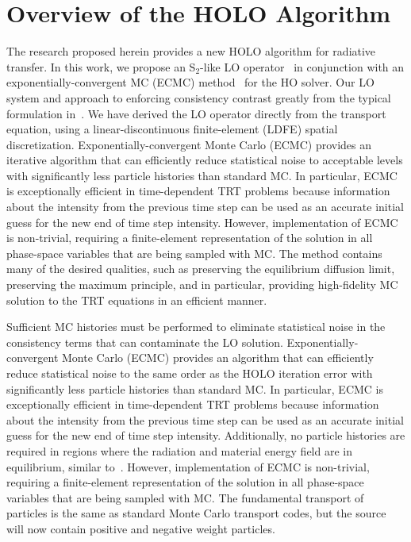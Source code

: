\section{Overview of the HOLO Algorithm}

The research proposed herein provides a new HOLO algorithm for radiative transfer.
In this work, we propose an S$_2$-like LO operator~\cite{wolters}
in conjunction with an exponentially-convergent MC (ECMC) method~\cite{jake} for the
HO solver. Our LO system and approach to enforcing consistency contrast greatly from the typical formulation
in~\cite{rmc,willert,park}. We have derived the LO operator directly from the transport
equation, using a linear-discontinuous finite-element (LDFE) spatial
discretization.   
Exponentially-convergent Monte Carlo (ECMC)\cite{jake,ans_2014} provides an iterative algorithm that can efficiently
reduce statistical noise to acceptable levels with
significantly less particle histories than standard MC. In particular, ECMC is
exceptionally efficient in time-dependent TRT problems because information about the
intensity from the previous time step can be used as an accurate initial guess for
the new end of time step intensity.   However, implementation
of ECMC is non-trivial, requiring a finite-element representation of the solution in
all phase-space variables that are being sampled with MC.  
The method contains many of the desired qualities, such as
preserving the equilibrium diffusion limit, preserving the maximum principle, and in
particular, providing high-fidelity MC solution to the TRT equations in an efficient
manner.

Sufficient MC histories must be performed to eliminate statistical
noise in the consistency terms that can contaminate the LO solution.
Exponentially-convergent Monte Carlo (ECMC)\cite{jake,ans_2014} provides an algorithm that can efficiently
reduce statistical noise to the same order as the HOLO iteration error with
significantly less particle histories than standard MC. In particular, ECMC is
exceptionally efficient in time-dependent TRT problems because information about the
intensity from the previous time step can be used as an accurate initial guess for
the new end of time step intensity. Additionally, no particle histories are required
in regions where the radiation and material energy field are in equilibrium, similar to~\cite{rmc}.  However, implementation
of ECMC is non-trivial, requiring a finite-element representation of the solution in
all phase-space variables that are being sampled with MC.  The fundamental transport of particles is the same
as standard Monte Carlo transport codes, but the source will now contain positive and
negative weight particles.

